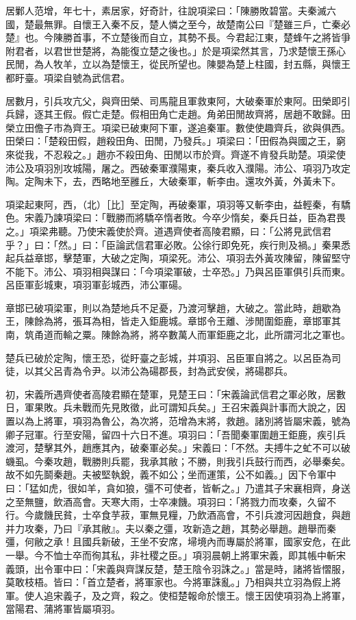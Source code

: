 \begin{pinyinscope}
居鄛人范增，年七十，素居家，好奇計，往說項梁曰：「陳勝敗碧當。夫秦滅六國，楚最無罪。自懷王入秦不反，楚人憐之至今，故楚南公曰『楚雖三戶，亡秦必楚』也。今陳勝首事，不立楚後而自立，其勢不長。今君起江東，楚蜂午之將皆爭附君者，以君世世楚將，為能復立楚之後也。」於是項梁然其言，乃求楚懷王孫心民閒，為人牧羊，立以為楚懷王，從民所望也。陳嬰為楚上柱國，封五縣，與懷王都盱臺。項梁自號為武信君。

居數月，引兵攻亢父，與齊田榮、司馬龍且軍救東阿，大破秦軍於東阿。田榮即引兵歸，逐其王假。假亡走楚。假相田角亡走趙。角弟田閒故齊將，居趙不敢歸。田榮立田儋子市為齊王。項梁已破東阿下軍，遂追秦軍。數使使趣齊兵，欲與俱西。田榮曰：「楚殺田假，趙殺田角、田閒，乃發兵。」項梁曰：「田假為與國之王，窮來從我，不忍殺之。」趙亦不殺田角、田閒以市於齊。齊遂不肯發兵助楚。項梁使沛公及項羽別攻城陽，屠之。西破秦軍濮陽東，秦兵收入濮陽。沛公、項羽乃攻定陶。定陶未下，去，西略地至雝丘，大破秦軍，斬李由。還攻外黃，外黃未下。

項梁起東阿，西，（北）［比］至定陶，再破秦軍，項羽等又斬李由，益輕秦，有驕色。宋義乃諫項梁曰：「戰勝而將驕卒惰者敗。今卒少惰矣，秦兵日益，臣為君畏之。」項梁弗聽。乃使宋義使於齊。道遇齊使者高陵君顯，曰：「公將見武信君乎？」曰：「然。」曰：「臣論武信君軍必敗。公徐行即免死，疾行則及禍。」秦果悉起兵益章邯，擊楚軍，大破之定陶，項梁死。沛公、項羽去外黃攻陳留，陳留堅守不能下。沛公、項羽相與謀曰：「今項梁軍破，士卒恐。」乃與呂臣軍俱引兵而東。呂臣軍彭城東，項羽軍彭城西，沛公軍碭。

章邯已破項梁軍，則以為楚地兵不足憂，乃渡河擊趙，大破之。當此時，趙歇為王，陳餘為將，張耳為相，皆走入鉅鹿城。章邯令王離、涉閒圍鉅鹿，章邯軍其南，筑甬道而輸之粟。陳餘為將，將卒數萬人而軍鉅鹿之北，此所謂河北之軍也。

楚兵已破於定陶，懷王恐，從盱臺之彭城，并項羽、呂臣軍自將之。以呂臣為司徒，以其父呂青為令尹。以沛公為碭郡長，封為武安侯，將碭郡兵。

初，宋義所遇齊使者高陵君顯在楚軍，見楚王曰：「宋義論武信君之軍必敗，居數日，軍果敗。兵未戰而先見敗徵，此可謂知兵矣。」王召宋義與計事而大說之，因置以為上將軍，項羽為魯公，為次將，范增為末將，救趙。諸別將皆屬宋義，號為卿子冠軍。行至安陽，留四十六日不進。項羽曰：「吾聞秦軍圍趙王鉅鹿，疾引兵渡河，楚擊其外，趙應其內，破秦軍必矣。」宋義曰：「不然。夫搏牛之虻不可以破蟣虱。今秦攻趙，戰勝則兵罷，我承其敝；不勝，則我引兵鼓行而西，必舉秦矣。故不如先鬬秦趙。夫被堅執銳，義不如公；坐而運策，公不如義。」因下令軍中曰：「猛如虎，很如羊，貪如狼，彊不可使者，皆斬之。」乃遣其子宋襄相齊，身送之至無鹽，飲酒高會。天寒大雨，士卒凍饑。項羽曰：「將戮力而攻秦，久留不行。今歲饑民貧，士卒食芋菽，軍無見糧，乃飲酒高會，不引兵渡河因趙食，與趙并力攻秦，乃曰『承其敝』。夫以秦之彊，攻新造之趙，其勢必舉趙。趙舉而秦彊，何敝之承！且國兵新破，王坐不安席，埽境內而專屬於將軍，國家安危，在此一舉。今不恤士卒而徇其私，非社稷之臣。」項羽晨朝上將軍宋義，即其帳中斬宋義頭，出令軍中曰：「宋義與齊謀反楚，楚王陰令羽誅之。」當是時，諸將皆慴服，莫敢枝梧。皆曰：「首立楚者，將軍家也。今將軍誅亂。」乃相與共立羽為假上將軍。使人追宋義子，及之齊，殺之。使桓楚報命於懷王。懷王因使項羽為上將軍，當陽君、蒲將軍皆屬項羽。


\end{pinyinscope}
